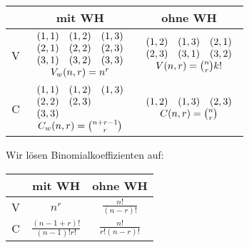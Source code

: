 \documentclass[a4paper,twocolumn]{article}
\begin{document}
\begin{tabular}{c|c|c}
                &       mit WH        &      ohne WH      \\
    \hline
    V           & $\begin{array}{ccc}
                  (1,1) & (1,2) & (1,3) \\
                  (2,1) & (2,2) & (2,3) \\
                  (3,1) & (3,2) & (3,3) \\
                  \multicolumn{3}{c}{V_w(n,r) = n^r} \\
                  \end{array}$
                                      & $\begin{array}{ccc}
                                        (1,2) & (1,3) & (2,1) \\
                                        (2,3) & (3,1) & (3,2) \\
                                        \multicolumn{3}{c}{
                                            V(n,r) = {n \choose r} k!
                                        } \\ \end{array}$ \\
    \hline
    C           & $\begin{array}{ccc}
                  (1,1) & (1,2) & (1,3) \\
                  (2,2) & (2,3) & \\
                  (3,3) &       & \\
                  \multicolumn{3}{c}{C_w(n,r) = {n+r-1 \choose r}} \\
                  \end{array}$
                                      & $\begin{array}{ccc}
                                        (1,2) & (1,3) & (2,3) \\
                                        \multicolumn{3}{c}{C(n,r)
                                            = {n \choose r}}
                                        \end{array}$ \\
\end{tabular}

\vspace{10pt}
Wir lösen Binomialkoeffizienten auf:

\begin{center}
\begin{tabular}{c|c|c}
                &       mit WH        &      ohne WH      \\
    \hline
    V           & $ n^r $             & $\frac{n!}{(n-r)!} $ \\
    \hline
    C           & $\frac{(n - 1 + r)!}{(n-1)! r!}$
                                      & $\frac{n!}{r! (n - r)!}$ \\
\end{tabular}
\end{center}
\vspace{10pt}
\end{document}

